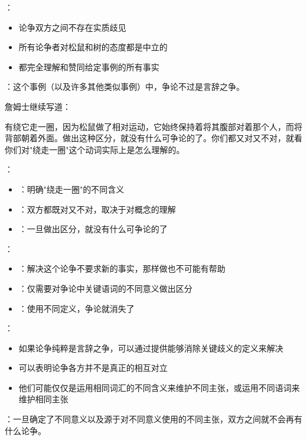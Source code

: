 \begin{theorembox}[title=松鼠例子的深层分析]
：
\begin{itemize}
  \item 论争双方之间不存在实质歧见
  \item 所有论争者对松鼠和树的态度都是中立的
  \item 都完全理解和赞同给定事例的所有事实
\end{itemize}

：这个事例（以及许多其他类似事例）中，争论不过是言辞之争。
\end{theorembox}

\begin{examplebox}[title=詹姆士的解决方案]
詹姆士继续写道：

\begin{displayquote}
有绕它走一圈，因为松鼠做了相对运动，它始终保持着将其腹部对着那个人，而将背部朝着外面。做出这种区分，就没有什么可争论的了。你们都又对又不对，就看你们对"绕走一圈"这个动词实际上是怎么理解的。\cite{james1907}
\end{displayquote}

：
\begin{itemize}
  \item {}：明确"绕走一圈"的不同含义
  \item {}：双方都既对又不对，取决于对概念的理解
  \item {}：一旦做出区分，就没有什么可争论的了
\end{itemize}
\end{examplebox}

\begin{theorembox}[title=纯粹言辞之争的解决原理]
：
\begin{itemize}
  \item {}：解决这个论争不要求新的事实，那样做也不可能有帮助
  \item {}：仅需要对争论中关键语词的不同意义做出区分
  \item {}：使用不同定义，争论就消失了
\end{itemize}

：
\begin{itemize}
  \item 如果论争纯粹是言辞之争，可以通过提供能够消除关键歧义的定义来解决
  \item 可以表明论争各方并不是真正的相互对立
  \item 他们可能仅仅是运用相同词汇的不同含义来维护不同主张，或运用不同语词来维护相同主张
\end{itemize}

：一旦确定了不同意义以及源于对不同意义使用的不同主张，双方之间就不会再有什么论争。\cite{rudin1992}
\end{theorembox}

